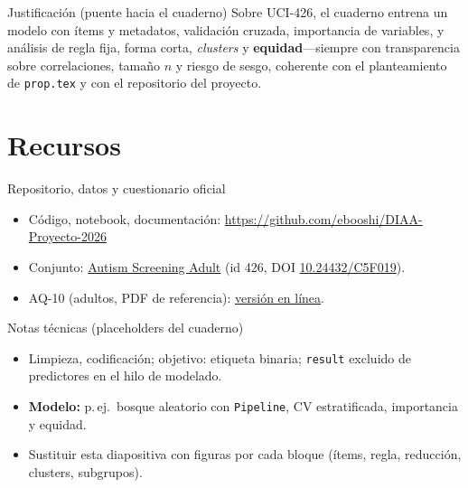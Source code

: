 \documentclass[11pt]{beamer}
\begin{document}
\begin{frame}{Justificación (puente hacia el cuaderno)}
  Sobre UCI-426, el cuaderno entrena un modelo con ítems y metadatos, validación cruzada, importancia de variables, y análisis de regla fija, forma corta, \emph{clusters} y \textbf{equidad}---siempre con transparencia sobre correlaciones, tamaño $n$ y riesgo de sesgo, coherente con el planteamiento de \texttt{prop.tex} y con el repositorio del proyecto.
\end{frame}

\section{Recursos}

\begin{frame}{Repositorio, datos y cuestionario oficial}
  \begin{itemize}
    \setlength{\itemsep}{0.45em}
    \item Código, notebook, documentación: \url{https://github.com/ebooshi/DIAA-Proyecto-2026}
    \item Conjunto: \href{https://archive.ics.uci.edu/dataset/426/autism+screening+adult}{Autism Screening Adult} (id 426, DOI \href{https://doi.org/10.24432/C5F019}{10.24432/C5F019}).
    \item AQ-10 (adultos, PDF de referencia): \href{https://leademployer.merseywestlancs.nhs.uk/media/Neurodiversity/Adult-autism-AQ10-questionnaire-test-v1.pdf}{versión en línea}.
  \end{itemize}
\end{frame}

\begin{frame}{Notas técnicas (placeholders del cuaderno)}
  \begin{itemize}
    \setlength{\itemsep}{0.35em}
    \footnotesize
    \item Limpieza, codificación; objetivo: etiqueta binaria; \texttt{result} excluido de predictores en el hilo de modelado.
    \item \textbf{Modelo:} p.\,ej.\ bosque aleatorio con \texttt{Pipeline}, CV estratificada, importancia y equidad.
    \item Sustituir esta diapositiva con figuras por cada bloque (ítems, regla, reducción, clusters, subgrupos).
  \end{itemize}
\end{frame}
\end{document}
